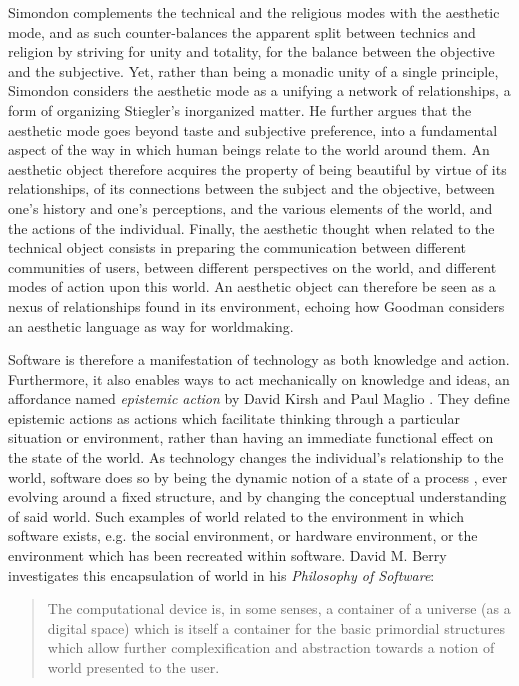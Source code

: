 Simondon complements the technical and the religious modes with the aesthetic mode, and as such counter-balances the apparent split between technics and religion by striving for unity and totality, for the balance between the objective and the subjective. Yet, rather than being a monadic unity of a single principle, Simondon considers the aesthetic mode as a unifying a network of relationships, a form of organizing Stiegler's inorganized matter. He further argues that the aesthetic mode goes beyond taste and subjective preference, into a fundamental aspect of the way in which human beings relate to the world around them. An aesthetic object therefore acquires the property of being beautiful by virtue of its relationships, of its connections between the subject and the objective, between one's history and one's perceptions, and the various elements of the world, and the actions of the individual. Finally, the aesthetic thought when related to the technical object consists in preparing the communication between different communities of users, between different perspectives on the world, and different modes of action upon this world. An aesthetic object can therefore be seen as a nexus of relationships found in its environment, echoing how Goodman considers an aesthetic language as way for worldmaking.

Software is therefore a manifestation of technology as both knowledge and action. Furthermore, it also enables ways to act mechanically on knowledge and ideas, an affordance named \emph{epistemic action} by David Kirsh and Paul Maglio \citep{kirsh_distinguishing_1994}. They define epistemic actions as actions which facilitate thinking through a particular situation or environment, rather than having an immediate functional effect on the state of the world. As technology changes the individual's relationship to the world, software does so by being the dynamic notion of a state of a process \citep{rapaport_philosophy_2005}, ever evolving around a fixed structure, and by changing the conceptual understanding of said world. Such examples of world related to the environment in which software exists, e.g. the social environment, or hardware environment, or the environment which has been recreated within software. David M. Berry investigates this encapsulation of world in his \emph{Philosophy of Software}:

\begin{quote}
    The computational device is, in some senses, a container of a universe (as a digital space) which is itself a container for the basic primordial structures which allow further complexification and abstraction towards a notion of world presented to the user. \citep{berry_philosophy_2011}
\end{quote}

